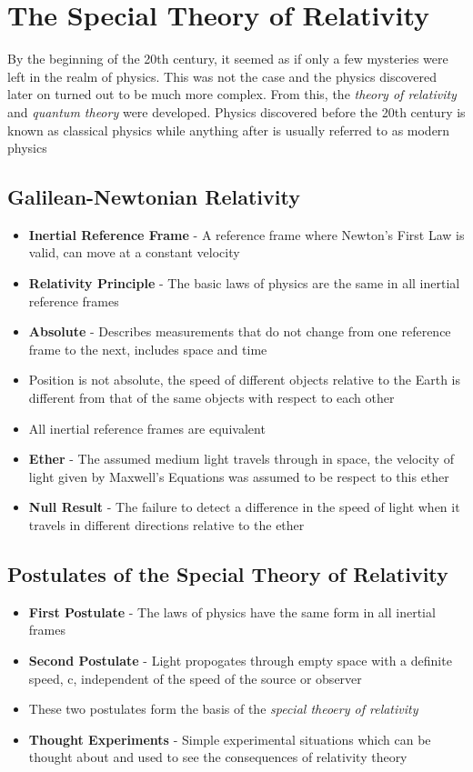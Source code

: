 \section{The Special Theory of Relativity}
By the beginning of the 20th century, it seemed as if only a few mysteries were left in the realm of physics. This was not the case and the physics discovered later on turned out to be much more complex. From this, the \emph{theory of relativity} and \emph{quantum theory} were developed. Physics discovered before the 20th century is known as classical physics while anything after is usually referred to as modern physics

\subsection{Galilean-Newtonian Relativity}
\begin{itemize}
    \item \textbf{Inertial Reference Frame} - A reference frame where Newton's First Law is valid, can move at a constant velocity
    \item\textbf{Relativity Principle} - The basic laws of physics are the same in all inertial reference frames
    \item \textbf{Absolute} - Describes measurements that do not change from one reference frame to the next, includes space and time
    \item Position is not absolute, the speed of different objects relative to the Earth is different from that of the same objects with respect to each other
    \item All inertial reference frames are equivalent
    \item \textbf{Ether} - The assumed medium light travels through in space, the velocity of light given by Maxwell's Equations was assumed to be respect to this ether
    \item\textbf{Null Result} - The failure to detect a difference in the speed of light when it  travels in different directions relative to the ether
\end{itemize}

\subsection{Postulates of the Special Theory of Relativity}
\begin{itemize}
    \item \textbf{First Postulate} - The laws of physics have the same form in all inertial frames
    \item \textbf{Second Postulate} - Light propogates through empty space with a definite speed, c, independent of the speed of the source or observer
    \item These two postulates form the basis of the \emph{special theoery of relativity}
    \item \textbf{Thought Experiments} - Simple experimental situations which can be thought about and used to see the consequences of relativity theory
\end{itemize}

